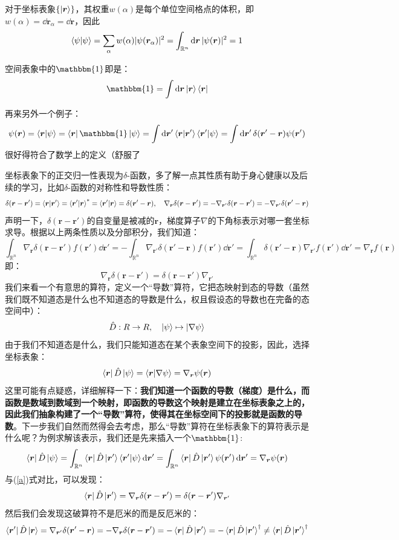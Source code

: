 对于坐标表象$\{\ket{\bm{r}}\}$，其权重$w(\alpha)$是每个单位空间格点的体积，即$w(\alpha)=\dd{\bm{r}_{\alpha}}=\dd{\bm{r}}$，因此
\[\bra{\psi}\ket{\psi}=\sum_{\alpha}w(\alpha)|\psi(\bm{r}_{\alpha})|^2=\int_{\mathbb{R}^n}\dd{\bm{r}}|\psi(\bm{r})|^2=1\]

空间表象中的$\mathbbm{1}$即是：
\[\mathbbm{1}=\int\dd{\bm{r}}\ket{\bm{r}}\bra{\bm{r}}\]

再来另外一个例子：
\[\psi(\bm{r})=\bra{\bm{r}}\ket{\psi}=\bra{\bm{r}}\mathbbm{1}\ket{\psi}=\int\dd{\bm{r}'}\bra{\bm{r}}\ket{\bm{r}'}\bra{\bm{r}'}\ket{\psi}=\int\dd{\bm{r}'}\delta(\bm{r}'-\bm{r})\psi(\bm{r}')\]
很好得符合了数学上的定义（舒服了

坐标表象下的正交归一性表现为$\delta$-函数，多了解一点其性质有助于身心健康以及后续的学习，比如$\delta$-函数的对称性和导数性质：
\[\delta(\bm{r}-\bm{r}')=\bra{\bm{r}}\ket{\bm{r}'}=\bra{\bm{r}'}\ket{\bm{r}}^*=\bra{\bm{r}'}\ket{\bm{r}}=\delta(\bm{r}'-\bm{r}), \quad \nabla_{\bm{r}}\delta(\bm{r}-\bm{r}')=-\nabla_{\bm{r}'}\delta(\bm{r}-\bm{r}')=-\nabla_{\bm{r}'}\delta(\bm{r}'-\bm{r})\]
声明一下，$\delta(\bm{r}-\bm{r}')$的自变量是被减的$\bm{r}$，梯度算子$\nabla$的下角标表示对哪一套坐标求导。根据以上两条性质以及分部积分，我们知道：
\[\int_{\mathbb{R}^n}\nabla_{\bm{r}}\delta(\bm{r}-\bm{r}')f(\bm{r}')\dd{\bm{r}'}=-\int_{\mathbb{R}^n}\nabla_{\bm{r'}}\delta(\bm{r}'-\bm{r})f(\bm{r}')\dd{\bm{r}'}=\int_{\mathbb{R}^n}\delta(\bm{r}'-\bm{r})\nabla_{\bm{r'}}f(\bm{r}')\dd{\bm{r}'}=\nabla_{\bm{r}}f(\bm{r}) \tag{a}\label{a}\]
即：
\[\nabla_{\bm{r}}\delta(\bm{r}-\bm{r}')=\delta(\bm{r}-\bm{r}')\nabla_{\bm{r}'}\]
我们来看一个有意思的算符，定义一个“导数”算符，它把态映射到态的导数（虽然我们既不知道态是什么也不知道态的导数是什么，权且假设态的导数也在完备的态空间中）：
\[\hat{D}:R \to R, \quad \ket{\psi} \mapsto \ket{\nabla\psi} \]
由于我们不知道态是什么，我们只能知道态在某个表象空间下的投影，因此，选择坐标表象：
\[\bra{\bm{r}}\hat{D}\ket{\psi}=\bra{\bm{r}}\ket{\nabla\psi}=\nabla_{\bm{r}}\psi(\bm{r})\]
这里可能有点疑惑，详细解释一下：\textbf{我们知道一个函数的导数（梯度）是什么，而函数是数域到数域到一个映射，即函数的导数这个映射是建立在坐标表象之上的，因此我们抽象构建了一个“导数”算符，使得其在坐标空间下的投影就是函数的导数}。下一步我们自然而然得会去考虑，那么“导数”算符在坐标表象下的算符表示是什么呢？为例求解该表示，我们还是先来插入一个$\mathbbm{1}$:
\[\bra{\bm{r}}\hat{D}\ket{\psi}=\int_{\mathbb{R}^n}\bra{\bm{r}}\hat{D}\ket{\bm{r}'}\bra{\bm{r}'}\ket{\psi}\dd{\bm{r}'}=\int_{\mathbb{R}^n}\bra{\bm{r}}\hat{D}\ket{\bm{r}'}\psi(\bm{r}')\dd{\bm{r}'}=\nabla_{\bm{r}}\psi(\bm{r})\]
与(\ref{a})式对比，可以发现：
\[\bra{\bm{r}}\hat{D}\ket{\bm{r}'}=\nabla_{\bm{r}}\delta(\bm{r}-\bm{r}')=\delta(\bm{r}-\bm{r}')\nabla_{\bm{r}'}\]
然后我们会发现这破算符不是厄米的而是反厄米的：
\[\bra{\bm{r}'}\hat{D}\ket{\bm{r}}=\nabla_{\bm{r}'}\delta(\bm{r}'-\bm{r})=-\nabla_{\bm{r}}\delta(\bm{r}-\bm{r}')=-\bra{\bm{r}}\hat{D}\ket{\bm{r}'}=-\bra{\bm{r}}\hat{D}\ket{\bm{r}'}^{\dagger}\neq\bra{\bm{r}}\hat{D}\ket{\bm{r}'}^{\dagger}\]


